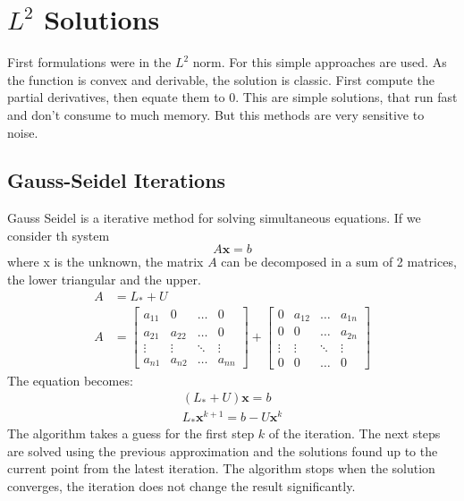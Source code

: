 \documentclass[12pt,a4paper,twoside]{report}
\begin{document}
\section{$L^2$ Solutions}

First formulations were in the $L^2$ norm. For this simple approaches are used. As the function is convex and derivable, the solution is classic. First compute the partial derivatives, then equate them to 0. This are simple solutions, that run fast and don't consume to much memory. But this methods are very sensitive to noise. 

\subsection{Gauss-Seidel Iterations} \label{GaussSeidel}
Gauss Seidel is a iterative method for solving simultaneous equations. If we consider th system 
\begin{equation}
A\boldsymbol{x} = b
\end{equation}
where x is the unknown, the matrix $A$ can be decomposed in a sum of 2 matrices, the lower triangular and the upper.
\begin{equation}
	\begin{split}
	A &= L_* +U \\
	A &= \begin{bmatrix}
	a_{11} &  0  & \ldots & 0\\
	a_{21} &  a_{22} & \ldots & 0\\
	\vdots & \vdots & \ddots & \vdots\\
	a_{n1} &  a_{n2}       &\ldots & a_{nn}
	\end{bmatrix}  
	+  \begin{bmatrix}
	0 &  a_{12}  & \ldots & a_{1n}\\
	0 &  0 & \ldots &a_{2n}\\
	\vdots & \vdots & \ddots & \vdots\\
	0 &  0  &\ldots & 0
	\end{bmatrix} 
 	\end{split}
\end{equation}
	The equation becomes:
\begin{equation}
\begin{split}
	(L_*+U)\boldsymbol{x} = b\\
	L_*\boldsymbol{x}^{k+1} = b - U\boldsymbol{x}^{k}
\end{split}
\end{equation}
The algorithm takes a guess for the first step  $k$ of the iteration. The next steps are solved using the previous approximation and the solutions found up to the current point from the latest iteration. The algorithm stops when the solution converges, the iteration does not change the result significantly.
\end{document}
